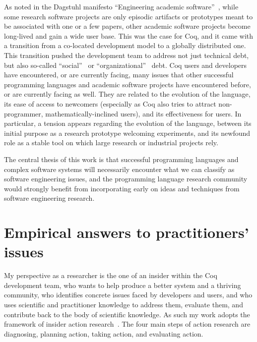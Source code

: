 As noted in the Dagstuhl manifesto ``Engineering academic software''~\cite{allen2017engineering}, while some research software projects are only episodic artifacts or prototypes meant to be associated with one or a few papers, other academic software projects become long-lived and gain a wide user base.
This was the case for Coq, and it came with a transition from a co-located development model to a globally distributed one.
This transition pushed the development team to address not just technical debt, but also so-called ``social''~\cite{tamburri2015social} or ``organizational''~\cite{boats2018organizational} debt.
Coq users and developers have encountered, or are currently facing, many issues that other successful programming languages and academic software projects have encountered before, or are currently facing as well.
They are related to the evolution of the language, its ease of access to newcomers (especially as Coq also tries to attract non-programmer, mathematically-inclined users), and its effectiveness for users.
In particular, a tension appears regarding the evolution of the language, between its initial purpose as a research prototype welcoming experiments, and its newfound role as a stable tool on which large research or industrial projects rely.

The central thesis of this work is that successful programming languages and complex software systems will necessarily encounter what we can classify as software engineering issues, and the programming language research community would strongly benefit from incorporating early on ideas and techniques from software engineering research.

\section{Empirical answers to practitioners' issues}

\label{sec:approach}

My perspective as a researcher is the one of an insider within the Coq development team, who wants to help produce a better system and a thriving community, who identifies concrete issues faced by developers and users, and who uses scientific and practitioner knowledge to address them, evaluate them, and contribute back to the body of scientific knowledge.
As such my work adopts the framework of insider action research~\cite{coghlan2019doing}.
The four main steps of action research are diagnosing, planning action, taking action, and evaluating action.

